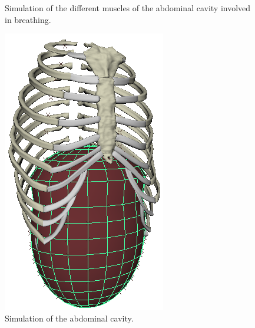 \begin{figure}
{\label{fig:simu_rectus_abdominis}
}
\caption[Simulation of the abdominal cavity muscles involved in breathing]{\label{fig:simu_abdominal_muscles}Simulation of the different muscles of the abdominal cavity involved in breathing.}
\end{figure}

\begin{figure}
	\centering
	 \includegraphics[scale=0.6]{pics/simu_abdominal_cavity}
	\caption[Simulation of the abdominal cavity]{\label{fig:simu_abdominal_cavity}Simulation of the abdominal cavity.}	
\end{figure}
